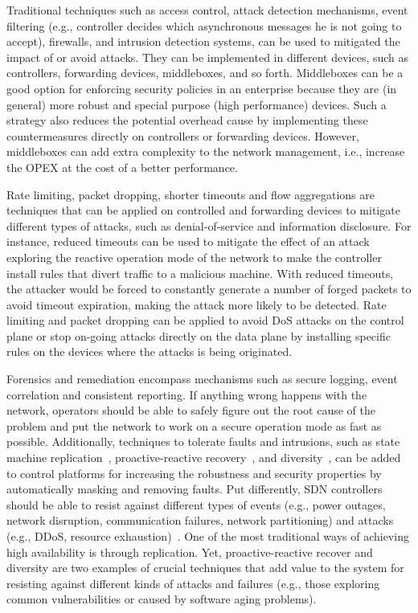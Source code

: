 Traditional techniques such as 
access control, attack detection mechanisms, event filtering (e.g.,  controller decides which asynchronous messages he is not going to accept), firewalls, and intrusion detection systems, can be used to mitigated the impact of or avoid attacks.
They can be implemented in different devices, such as controllers, forwarding devices, middleboxes, and so forth.
Middleboxes can be a good option for enforcing security policies in an enterprise because they are (in general) more robust and special purpose (high performance) devices.
Such a strategy also reduces the potential overhead cause by implementing these countermeasures directly on controllers or forwarding devices.
However, middleboxes can add extra complexity to the network management, i.e., increase the OPEX at the cost of a better performance.

Rate limiting, packet dropping, shorter timeouts and flow aggregations are techniques that can be applied on controlled and forwarding devices to mitigate different types of attacks, such as denial-of-service and information disclosure.
For instance, reduced timeouts can be used to mitigate the effect of an attack exploring the reactive operation mode of the network to make the controller install rules that divert traffic to a malicious machine. 
With reduced timeouts, the attacker would be forced to constantly generate a number of forged packets to avoid timeout expiration, making the attack more likely to be detected.
Rate limiting and packet dropping can be applied to avoid DoS attacks on the control plane or stop on-going attacks directly on the data plane by installing specific rules on the devices where the attacks is being originated.

Forensics and remediation encompass mechanisms such as secure logging, event correlation and consistent reporting. 
If anything wrong happens with the network, operators should be able to safely figure out the root cause of the problem and put the network to work on a secure operation mode as fast as possible.
Additionally, techniques to tolerate faults and intrusions, such as state machine replication~\cite{bolosky2011}, proactive-reactive recovery~\cite{sousa2010}, and diversity~\cite{garcia2013}, can be added to control platforms for increasing the robustness and security properties by automatically masking and removing faults.
Put differently, SDN controllers should be able to resist against different types of events (e.g., power outages, network disruption, communication failures, network partitioning) and attacks (e.g., DDoS, resource exhaustion)~\cite{kreutz2013,botelho2013}. 
One of the most traditional ways of achieving high availability is through replication. 
Yet, proactive-reactive recover and diversity are two examples of crucial techniques that add value to the system for resisting against different kinds of attacks and failures (e.g., those exploring common vulnerabilities or caused by software aging problems).

